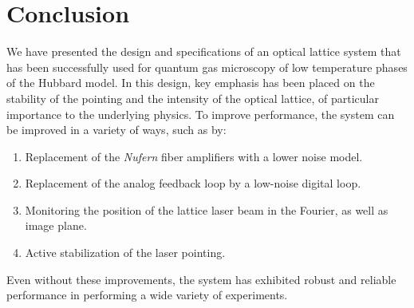 \documentclass[twocolumn,aps,pra,showpacs,preprintnumbers,bibnotes]{revtex4-1}
\begin{document}
\section{Conclusion}
We have presented the design and specifications of an optical lattice system that has been successfully used for quantum gas microscopy of low temperature phases of the Hubbard model.
In this design, key emphasis has been placed on the stability of the pointing and the intensity of the optical lattice, of particular importance to the underlying physics.
To improve performance, the system can be improved in a variety of ways, such as by:
\begin{enumerate}
  \item Replacement of the \textit{Nufern} fiber amplifiers with a lower noise model.
  \item Replacement of the analog feedback loop by a low-noise digital loop.
  \item Monitoring the position of the lattice laser beam in the Fourier, as well as image plane.
  \item Active stabilization of the laser pointing.
\end{enumerate}
Even without these improvements, the system has exhibited robust and reliable performance in performing a wide variety of experiments.


\end{document}
